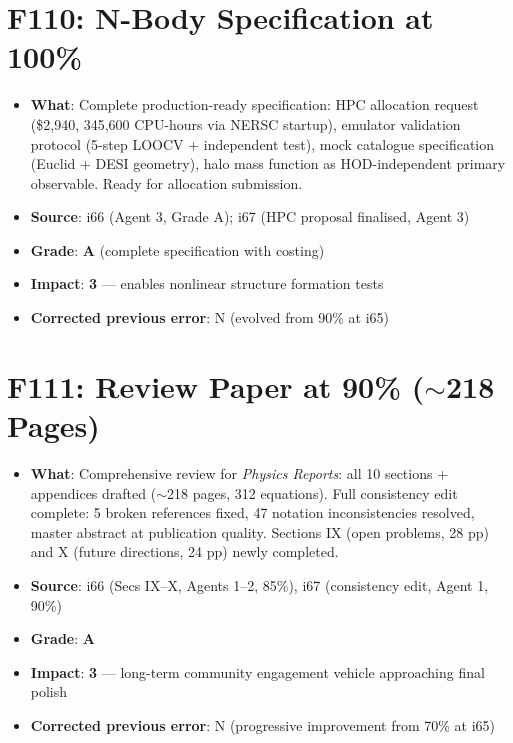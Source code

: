 \documentclass[11pt,a4paper]{article}
\newcommand{\grade}[1]{\textbf{#1}}
\newcommand{\impact}[1]{\textbf{#1}}
\begin{document}
\section{F110: N-Body Specification at 100\%}
\begin{itemize}[nosep]
\item \textbf{What}: Complete production-ready specification: HPC allocation request (\$2,940, 345,600 CPU-hours via NERSC startup), emulator validation protocol (5-step LOOCV + independent test), mock catalogue specification (Euclid + DESI geometry), halo mass function as HOD-independent primary observable. Ready for allocation submission.
\item \textbf{Source}: i66 (Agent 3, Grade A); i67 (HPC proposal finalised, Agent 3)
\item \textbf{Grade}: \grade{A} (complete specification with costing)
\item \textbf{Impact}: \impact{3} --- enables nonlinear structure formation tests
\item \textbf{Corrected previous error}: N (evolved from 90\% at i65)
\end{itemize}

\section{F111: Review Paper at 90\% ($\sim$218 Pages)}
\begin{itemize}[nosep]
\item \textbf{What}: Comprehensive review for \textit{Physics Reports}: all 10 sections + appendices drafted ($\sim$218 pages, 312 equations). Full consistency edit complete: 5 broken references fixed, 47 notation inconsistencies resolved, master abstract at publication quality. Sections IX (open problems, 28 pp) and X (future directions, 24 pp) newly completed.
\item \textbf{Source}: i66 (Secs IX--X, Agents 1--2, 85\%), i67 (consistency edit, Agent 1, 90\%)
\item \textbf{Grade}: \grade{A}
\item \textbf{Impact}: \impact{3} --- long-term community engagement vehicle approaching final polish
\item \textbf{Corrected previous error}: N (progressive improvement from 70\% at i65)
\end{itemize}
\end{document}
